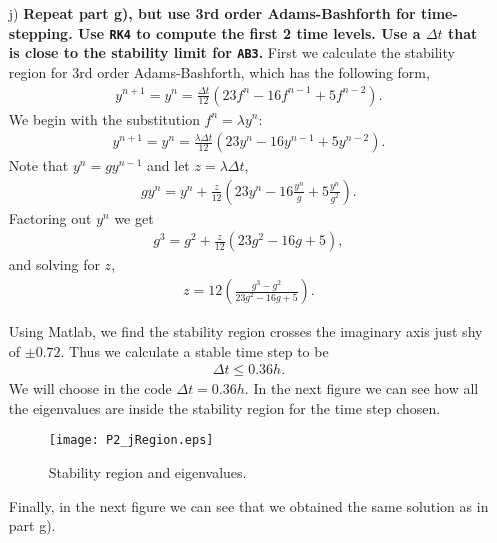 \begin{enumerate}
\item[j)] \textbf{Repeat part g), but use 3rd order Adams-Bashforth for time-stepping. Use \texttt{RK4} to compute the first 2 time levels. Use a $\Delta t$ that is close to the stability limit for \texttt{AB3}.}
First we calculate the stability region for 3rd order Adams-Bashforth, which has the following form,
\begin{align*}
y^{n+1} = y^n = \frac{\Delta t}{12}(23f^n - 16f^{n-1} + 5f^{n-2}).
\end{align*}
We begin with the substitution $f^n = \lambda y^n$: 
\begin{align*}
y^{n+1} = y^n = \frac{\lambda \Delta t}{12}(23y^n - 16y^{n-1} + 5y^{n-2}).
\end{align*}
Note that $y^n = gy^{n-1}$ and let $z = \lambda \Delta t$,
\begin{align*}
gy^n = y^n + \frac{z}{12}\left(23y^n - 16\frac{y^n}{g} + 5\frac{y^n}{g^2}\right).
\end{align*}
Factoring out $y^n$ we get
\begin{align*}
g^3 = g^2 + \frac{z}{12}(23g^2 - 16g +5),
\end{align*}
and solving for $z$,
\begin{align*}
z = 12 \left( \frac{g^3-g^2}{23g^2-16g+5} \right).
\end{align*}


Using Matlab, we find the stability region crosses the imaginary axis just shy of $\pm 0.72$. Thus we calculate a stable time step to be
\begin{align*}
\Delta t\leq 0.36h.
\end{align*}
We will choose in the code $\Delta t = 0.36h$. In the next figure we can see how all the eigenvalues are inside the stability region for the time step chosen.

\begin{figure}[H]
\centering     %
{\texttt{[image: P2\_jRegion.eps]}}
\caption{Stability region and eigenvalues.}
\end{figure}

Finally, in the next figure we can see that we obtained the same solution as in part g).

\begin{figure}[H]
\centering     %
\hspace*{\fill}
\subfigure[Solutions at $t = \pi/2$.]{\texttt{[image: P2\_j1]}}
\hfill
\subfigure[Solutions at $t = \pi$.]{\texttt{[image: P2\_j2]}}
\hspace*{\fill}


\end{figure}
\end{enumerate}
